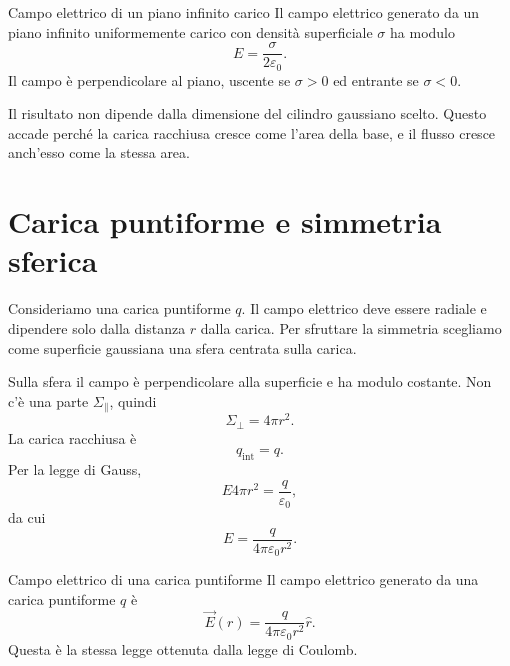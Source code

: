 \documentclass[a4paper]{article}
\begin{document}
\begin{snippettheorem}{Campo elettrico di un piano infinito carico}
    Il campo elettrico generato da un piano infinito uniformemente carico con densità superficiale \(\sigma\) ha modulo
    \[
        E=\frac{\sigma}{2\varepsilon_0}.
    \]
    Il campo è perpendicolare al piano, uscente se \(\sigma>0\) ed entrante se \(\sigma<0\).
\end{snippettheorem}

Il risultato non dipende dalla dimensione del cilindro gaussiano scelto. Questo accade perché la carica racchiusa cresce come l'area della base, e il flusso cresce anch'esso come la stessa area.

\section{Carica puntiforme e simmetria sferica}

Consideriamo una carica puntiforme \(q\). Il campo elettrico deve essere radiale e dipendere solo dalla distanza \(r\) dalla carica. Per sfruttare la simmetria scegliamo come superficie gaussiana una sfera centrata sulla carica.

\begin{center}
\end{center}

Sulla sfera il campo è perpendicolare alla superficie e ha modulo costante. Non c'è una parte \(\Sigma_\parallel\), quindi
\[
    \Sigma_\perp=4\pi r^2.
\]
La carica racchiusa è
\[
    q_{\mathrm{int}}=q.
\]
Per la legge di Gauss,
\[
    E4\pi r^2=\frac{q}{\varepsilon_0},
\]
da cui
\[
    E=\frac{q}{4\pi\varepsilon_0r^2}.
\]

\begin{snippettheorem}{Campo elettrico di una carica puntiforme}
    Il campo elettrico generato da una carica puntiforme \(q\) è
    \[
        \vec{E}(r)=\frac{q}{4\pi\varepsilon_0r^2}\hat{r}.
    \]
    Questa è la stessa legge ottenuta dalla legge di Coulomb.
\end{snippettheorem}
\end{document}

